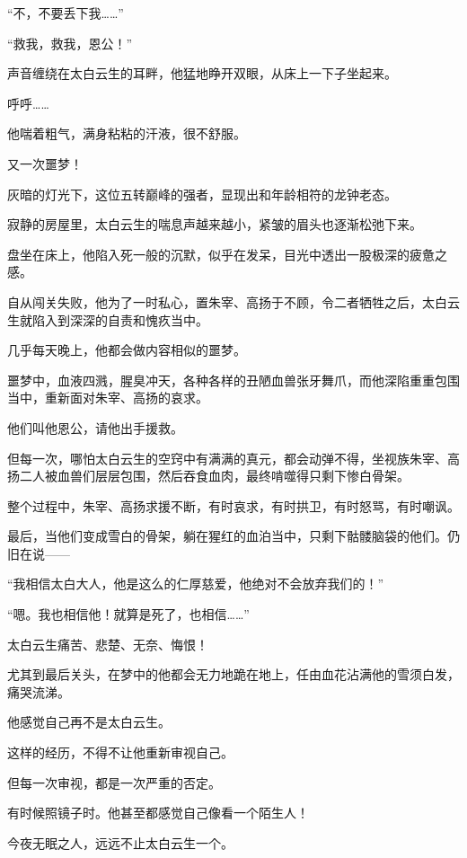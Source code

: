 
\begin{this_body}

“不，不要丢下我……”

“救我，救我，恩公！”

声音缠绕在太白云生的耳畔，他猛地睁开双眼，从床上一下子坐起来。

呼呼……

他喘着粗气，满身粘粘的汗液，很不舒服。

又一次噩梦！

灰暗的灯光下，这位五转巅峰的强者，显现出和年龄相符的龙钟老态。

寂静的房屋里，太白云生的喘息声越来越小，紧皱的眉头也逐渐松弛下来。

盘坐在床上，他陷入死一般的沉默，似乎在发呆，目光中透出一股极深的疲惫之感。

自从闯关失败，他为了一时私心，置朱宰、高扬于不顾，令二者牺牲之后，太白云生就陷入到深深的自责和愧疚当中。

几乎每天晚上，他都会做内容相似的噩梦。

噩梦中，血液四溅，腥臭冲天，各种各样的丑陋血兽张牙舞爪，而他深陷重重包围当中，重新面对朱宰、高扬的哀求。

他们叫他恩公，请他出手援救。

但每一次，哪怕太白云生的空窍中有满满的真元，都会动弹不得，坐视族朱宰、高扬二人被血兽们层层包围，然后吞食血肉，最终啃噬得只剩下惨白骨架。

整个过程中，朱宰、高扬求援不断，有时哀求，有时拱卫，有时怒骂，有时嘲讽。

最后，当他们变成雪白的骨架，躺在猩红的血泊当中，只剩下骷髅脑袋的他们。仍旧在说——

“我相信太白大人，他是这么的仁厚慈爱，他绝对不会放弃我们的！”

“嗯。我也相信他！就算是死了，也相信……”

太白云生痛苦、悲楚、无奈、悔恨！

尤其到最后关头，在梦中的他都会无力地跪在地上，任由血花沾满他的雪须白发，痛哭流涕。

他感觉自己再不是太白云生。

这样的经历，不得不让他重新审视自己。

但每一次审视，都是一次严重的否定。

有时候照镜子时。他甚至都感觉自己像看一个陌生人！

今夜无眠之人，远远不止太白云生一个。


\end{this_body}
